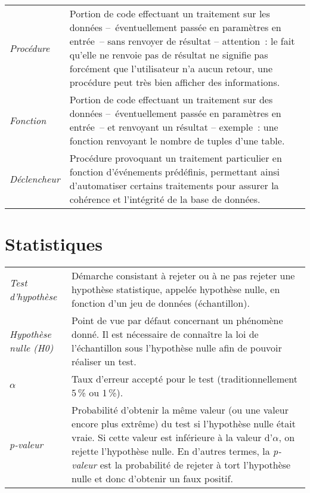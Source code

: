 \begin{longtable}{>{\itshape}p{}p{}}
		Procédure	& Portion de code effectuant un traitement sur les données --~éventuellement passée en paramètres en entrée~-- sans renvoyer de résultat -- attention~: le fait qu'elle ne renvoie pas de résultat ne signifie pas forcément que l'utilisateur n'a aucun retour, une procédure peut très bien afficher des informations.
		\vspace{2mm}\\
		Fonction	& Portion de code effectuant un traitement sur des données --~éventuellement passée en paramètres en entrée~-- et renvoyant un résultat -- exemple~: une fonction renvoyant le nombre de tuples d'une table.
		\vspace{2mm}\\
		Déclencheur	& Procédure provoquant un traitement particulier en fonction d'événements prédéfinis, permettant ainsi d'automatiser certains traitements pour assurer la cohérence et l'intégrité de la base de données.
	\end{longtable}



\section{Statistiques}
	\begin{longtable}{>{\itshape}p{}p{}}
		Test d'hypothèse	& Démarche consistant à rejeter ou à ne pas rejeter une hypothèse statistique, appelée hypothèse nulle, en fonction d'un jeu de données (échantillon).
		\vspace{2mm}\\
		Hypothèse nulle (H0)	& Point de vue par défaut concernant un phénomène donné. Il est nécessaire de connaître la loi de l'échantillon sous l'hypothèse nulle afin de pouvoir réaliser un test.
		\vspace{2mm}\\
		$\alpha$		& Taux d'erreur accepté pour le test (traditionnellement 5\,\% ou 1\,\%). 
		\vspace{2mm}\\
		p-valeur	& Probabilité d'obtenir la même valeur (ou une valeur encore plus extrême) du test si l'hypothèse nulle était vraie. Si cette valeur est inférieure à la valeur d'$\alpha$, on rejette l'hypothèse nulle. En d'autres termes, la \textit{p-valeur} est la probabilité de rejeter à tort l'hypothèse nulle et donc d'obtenir un faux positif.
	\end{longtable}




